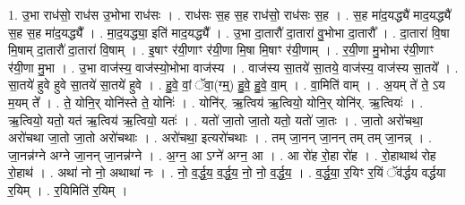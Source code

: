 \documentclass[17pt]{extarticle}
\begin{document}
1. उ॒भा राध॑सो॒ राध॑स उ॒भोभा राध॑सः । . राध॑सः स॒ह स॒ह राध॑सो॒ राध॑सः स॒ह । . स॒ह मा॑द॒यद्ध्यै॑ माद॒यद्ध्यै॑ स॒ह स॒ह मा॑द॒यद्ध्यै᳚ । . मा॒द॒यद्ध्या॒ इति॑ माद॒यद्ध्यै᳚ । . उ॒भा दा॒तारौ॑ दा॒तारा॑ वु॒भोभा दा॒तारौ᳚ । . दा॒तारा॑ वि॒षा मि॒षाम् दा॒तारौ॑ दा॒तारा॑ वि॒षाम् । . इ॒षाꣳ र॑यी॒णाꣳ र॑यी॒णा मि॒षा मि॒षाꣳ र॑यी॒णाम् । . र॒यी॒णा मु॒भोभा र॑यी॒णाꣳ र॑यी॒णा मु॒भा । . उ॒भा वाज॑स्य॒ वाज॑स्यो॒भोभा वाज॑स्य । . वाज॑स्य सा॒तये॑ सा॒तये॒ वाज॑स्य॒ वाज॑स्य सा॒तये᳚ । . सा॒तये॑ हुवे हुवे सा॒तये॑ सा॒तये॑ हुवे । . हु॒वे॒ वां॒ ॅवा॒(ग्म्॒) हु॒वे॒ हु॒वे॒ वा॒म् । . वा॒मिति॑ वाम् । . अ॒यम् ते॑ ते॒ ऽय म॒यम् ते᳚ । . ते॒ योनि॒र् योनि॑स्ते ते॒ योनिः॑ । . योनि॑र्. ऋ॒त्विय॑ ऋ॒त्वियो॒ योनि॒र् योनि॑र्. ऋ॒त्वियः॑ । . ऋ॒त्वियो॒ यतो॒ यत॑ ऋ॒त्विय॑ ऋ॒त्वियो॒ यतः॑ । . यतो॑ जा॒तो जा॒तो यतो॒ यतो॑ जा॒तः । . जा॒तो अरो॑चथा॒ अरो॑चथा जा॒तो जा॒तो अरो॑चथाः । . अरो॑चथा॒ इत्यरो॑चथाः । . तम् जा॒नन् जा॒नन् तम् तम् जा॒नन्न् । . जा॒नन्न॑ग्ने अग्ने जा॒नन् जा॒नन्न॑ग्ने । . अ॒ग्न॒ आ ऽग्ने॑ अग्न॒ आ । . आ रो॑ह रो॒हा रो॑ह । . रो॒हाथाथ॑ रोह रो॒हाथ॑ । . अथा॑ नो नो॒ अथाथा॑ नः । . नो॒ व॒र्द्ध॒य॒ व॒र्द्ध॒य॒ नो॒ नो॒ व॒र्द्ध॒य॒ । . व॒र्द्ध॒या॒ र॒यिꣳ र॒यिं ॅव॑र्द्धय वर्द्धया र॒यिम् । . र॒यिमिति॑ र॒यिम् । \newline
\end{document}
